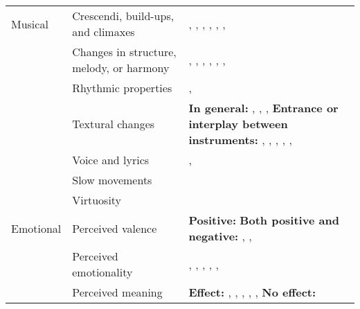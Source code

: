 \begin{table}[t!]
\begin{threeparttable}
\begin{tabular*}{\textwidth}{
    >{\raggedright}p{}
    >{\raggedright}p{}
    >{\raggedright\arraybackslash}p{}}
\hline
Musical & Crescendi, build-ups, and climaxes & 
    \textcite{auricchio2017}, \textcite{bannister2018}, \textcite{bannister2020a}, \textcite{goldstein1980}, \textcite{panksepp1995}, \textcite{polo2017}, \textcite{solberg2019} \\

\cline{2-3}
& Changes in structure, melody, or harmony & 
    \textcite{auricchio2017}, \textcite{bannister2018}, \textcite{bannister2020a}, \textcite{guhn2007}, \textcite{mlejnek2013}, \textcite{schurtz2012}, \textcite{sloboda1991} \\ 
    
\cline{2-3}
& Rhythmic properties & 
    \textcite{schurtz2012}, \textcite{solberg2019} \\
    
\cline{2-3}
& Textural changes & 
    \textbf{In general:} \textcite{auricchio2017}, \textcite{polo2017}, \textcite{sloboda1991}, \textcite{solberg2019} 
    \newline 
    \textbf{Entrance or interplay between instruments:} \textcite{auricchio2017}, \textcite{bannister2018}, \textcite{bannister2020a}, \textcite{goodchild2019}, \textcite{guhn2007}, \textcite{mlejnek2013} \\
    
\cline{2-3}
& Voice and lyrics & 
    \textcite{bannister2020a}, \textcite{schurtz2012} \\
    
\cline{2-3}
& Slow movements & 
    \textcite{guhn2007} \\
    
\cline{2-3}
& Virtuosity & 
    \textcite{mlejnek2013} \\
                       
\hline
Emotional & Perceived valence & 
    \textbf{Positive:} \textcite{grewe2011} 
    \newline 
    \textbf{Both positive and negative:} \textcite{bannister2020a}, \textcite{mori2017}, \textcite{panksepp1995} \\
    
\cline{2-3}
& Perceived emotionality & 
    \textcite{bannister2018}, \textcite{beier2020}, \textcite{grewe2009a}, \textcite{panksepp1995}, \textcite{panzarella1980}, \textcite{rickard2004} \\
    
\cline{2-3}
& Perceived meaning & 
    \textbf{Effect:} \textcite{bannister2020a}, \textcite{craig2009}, \textcite{goldstein1980}, \textcite{mlejnek2013}, \textcite{schoeller2016}, \textcite{schoeller2018a} 
    \newline 
    \textbf{No effect:} \textcite{konecni2007b} \\
    
\hline

\end{tabular*}
\end{threeparttable}
\end{table}